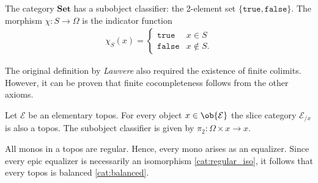     \begin{example}
        The category $\mathbf{Set}$ has a subobject classifier: the 2-element set $\{\texttt{true},\texttt{false}\}$. The morphism $\chi:S\rightarrow\Omega$ is the indicator function
        \begin{gather}
            \chi_S(x)=
            \begin{cases}
                \texttt{true}&x\in S\\
                \texttt{false}&x\not\in S.
            \end{cases}
        \end{gather}
    \end{example}

    \begin{remark}
        The original definition by \textit{Lawvere} also required the existence of finite colimits. However, it can be proven that finite cocompleteness follows from the other axioms.
    \end{remark}

    \begin{theorem}
        Let $\mathcal{E}$ be an elementary topos. For every object $x\in\ob{\mathcal{E}}$ the slice category $\mathcal{E}_{/x}$ is also a topos. The subobject classifier is given by $\pi_2:\Omega\times x\rightarrow x$.
    \end{theorem}

    \begin{property}[Balanced]
        All monos in a topos are regular. Hence, every mono arises as an equalizer. Since every epic equalizer is necessarily an isomorphism \ref{cat:regular_iso}, it follows that every topos is balanced \ref{cat:balanced}.
    \end{property}

